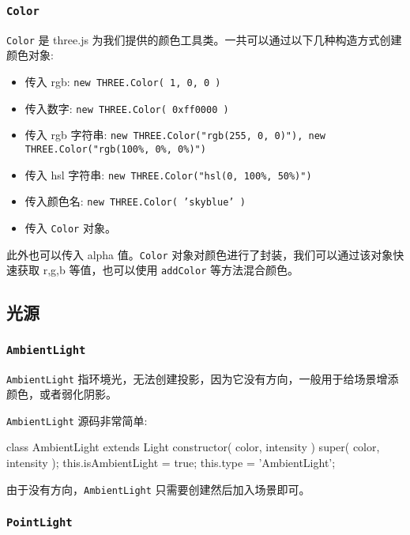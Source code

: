 \subsubsection*{\texttt{Color}}

\texttt{Color} 是 three.js 为我们提供的颜色工具类。一共可以通过以下几种构造方式创建颜色对象:
\begin{itemize}
  \item 传入 rgb: \texttt{new THREE.Color( 1, 0, 0 )}
  \item 传入数字: \texttt{new THREE.Color( 0xff0000 )}
  \item 传入 rgb 字符串: \texttt{new THREE.Color("rgb(255, 0, 0)"), new THREE.Color("rgb(100\%, 0\%, 0\%)")}
  \item 传入 hsl 字符串: \texttt{new THREE.Color("hsl(0, 100\%, 50\%)")}
  \item 传入颜色名: \texttt{new THREE.Color( 'skyblue' )}
  \item 传入 \texttt{Color} 对象。
\end{itemize}

此外也可以传入 alpha 值。\texttt{Color} 对象对颜色进行了封装，我们可以通过该对象快速获取 r,g,b 等值，也可以使用 \texttt{addColor} 等方法混合颜色。

\subsection{光源}

\subsubsection*{\texttt{AmbientLight}}

\texttt{AmbientLight} 指环境光，无法创建投影，因为它没有方向，一般用于给场景增添颜色，或者弱化阴影。

\texttt{AmbientLight} 源码非常简单:

\begin{JavaScript}
class AmbientLight extends Light {
	constructor( color, intensity ) {
		super( color, intensity );
		this.isAmbientLight = true;
		this.type = 'AmbientLight';
	}
}
\end{JavaScript}

由于没有方向，\texttt{AmbientLight} 只需要创建然后加入场景即可。

\subsubsection*{\texttt{PointLight}}

